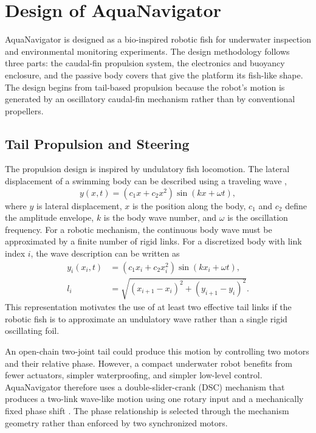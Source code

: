 \documentclass{uhcoethesis}
\begin{document}
\section{Design of AquaNavigator}

AquaNavigator is designed as a bio-inspired robotic fish for underwater inspection and environmental monitoring experiments. The design methodology follows three parts: the caudal-fin propulsion system, the electronics and buoyancy enclosure, and the passive body covers that give the platform its fish-like shape. The design begins from tail-based propulsion because the robot's motion is generated by an oscillatory caudal-fin mechanism rather than by conventional propellers.

\subsection{Tail Propulsion and Steering}

The propulsion design is inspired by undulatory fish locomotion. The lateral displacement of a swimming body can be described using a traveling wave \cite{Lighthill1969,Lighthill1971},
\begin{equation}
    y(x,t) = (c_1x+c_2x^2)\sin(kx+\omega t),
    \label{eq:ch2_design_wave}
\end{equation}
where $y$ is lateral displacement, $x$ is the position along the body, $c_1$ and $c_2$ define the amplitude envelope, $k$ is the body wave number, and $\omega$ is the oscillation frequency. For a robotic mechanism, the continuous body wave must be approximated by a finite number of rigid links. For a discretized body with link index $i$, the wave description can be written as
\begin{equation}
    \begin{aligned}
        y_i(x_i,t) &= (c_1x_i+c_2x_i^2)\sin(kx_i+\omega t), \\
        l_i &= \sqrt{(x_{i+1}-x_i)^2+(y_{i+1}-y_i)^2}.
    \end{aligned}
    \label{eq:ch2_discrete_wave}
\end{equation}
This representation motivates the use of at least two effective tail links if the robotic fish is to approximate an undulatory wave rather than a single rigid oscillating foil.

An open-chain two-joint tail could produce this motion by controlling two motors and their relative phase. However, a compact underwater robot benefits from fewer actuators, simpler waterproofing, and simpler low-level control. AquaNavigator therefore uses a double-slider-crank (DSC) mechanism that produces a two-link wave-like motion using one rotary input and a mechanically fixed phase shift \cite{Zuo2021,Masood2025Pipeline}. The phase relationship is selected through the mechanism geometry rather than enforced by two synchronized motors.
\end{document}
